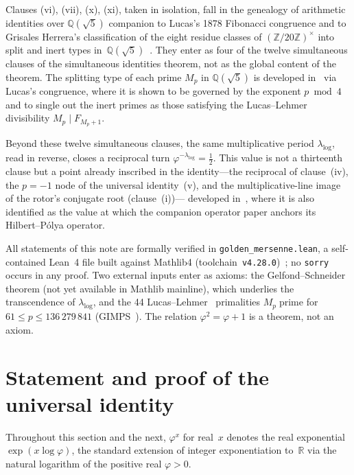 \documentclass[11pt]{amsart}
\theoremstyle{definition}
\newcommand{\golden}{\varphi}
\newcommand{\Mp}{M_{p}}
\newcommand{\Ztwenty}{(\mathbb{Z}/20\mathbb{Z})^{\times}}
\begin{document}
Clauses (vi), (vii), (x), (xi), taken in isolation, fall in the
genealogy of arithmetic identities over
$\mathbb{Q}(\sqrt{5})$ companion to Lucas's 1878 Fibonacci
congruence and to Grisales Herrera's classification of the eight
residue classes of $\Ztwenty$ into split and inert types
in~$\mathbb{Q}(\sqrt{5})$~\cite{grisales}.  They enter
 as four of the twelve simultaneous clauses
of the simultaneous identities theorem, not as the global content of the
theorem.  The splitting type of each prime $\Mp$ in $\mathbb{Q}(\sqrt5)$ is
developed in~ via Lucas's congruence, where it is
shown to be governed by the exponent $p\bmod4$ and to single out the
inert primes as those satisfying the Lucas--Lehmer divisibility
$\Mp\mid F_{\Mp+1}$.

Beyond these twelve simultaneous clauses, the same multiplicative period
$\lambda_{\log}$, read in reverse, closes a reciprocal turn
$\golden^{-\lambda_{\log}}=\tfrac12$.  This value is not a thirteenth
clause but a point already inscribed in the identity---the reciprocal of
clause~(iv), the $p=-1$ node of the universal identity~(v), and the
multiplicative-line image of the rotor's conjugate root (clause~(i))---%
developed in~, where it is also identified as the
value at which the companion operator paper anchors its Hilbert--P\'olya
operator.

All statements of this note are formally verified in
\texttt{golden\_mersenne.lean}, a self-contained Lean~4
file built against Mathlib4 (toolchain~\texttt{v4.28.0})~\cite{mathlib};
no \texttt{sorry} occurs in any proof.  Two external inputs enter as
axioms: the Gelfond--Schneider theorem (not yet available in Mathlib
mainline), which underlies the transcendence of $\lambda_{\log}$, and the
44 Lucas--Lehmer~\cite{lehmer} primalities $M_{p}\;\text{prime}$ for
$61\leq p\leq 136\,279\,841$ (GIMPS~\cite{gimps}).  The relation
$\golden^{2}=\golden+1$ is a theorem, not an axiom.

\section{Statement and proof of the universal identity}
\label{sec:universal}

Throughout this section and the next, $\golden^{x}$ for real~$x$
denotes the real exponential $\exp(x\log\golden)$, the standard
extension of integer exponentiation to~$\mathbb{R}$ via the natural
logarithm of the positive real $\golden>0$.
\end{document}

